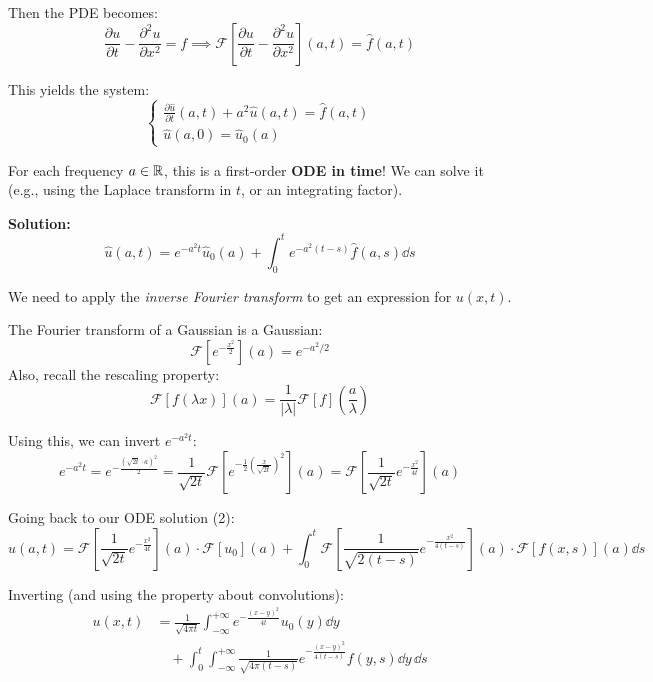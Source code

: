 Then the PDE becomes:
$$ \frac{\partial u}{\partial t} - \frac{\partial^2 u}{\partial x^2} = f \implies \mathcal{F}\left[ \frac{\partial u}{\partial t} - \frac{\partial^2 u}{\partial x^2} \right](a,t) = \hat{f}(a,t) $$

This yields the system:
\begin{equation*}
\begin{cases}
    \displaystyle \frac{\partial \hat{u}}{\partial t}(a,t) + a^2 \hat{u}(a,t) = \hat{f}(a,t) \\[2ex]
    \hat{u}(a,0) = \hat{u}_0(a)
\end{cases}
\end{equation*}

For each frequency $a \in \mathbb{R}$, this is a first-order \textbf{ODE in time}! We can solve it (e.g., using the Laplace transform in $t$, or an integrating factor).

\textbf{Solution:}
\begin{equation}
    \hat{u}(a,t) = e^{-a^2t}\hat{u}_0(a) + \int_0^t e^{-a^2(t-s)}\hat{f}(a,s) \dd s
\end{equation}

We need to apply the \textit{inverse Fourier transform} to get an expression for $u(x,t)$. 

\begin{recall}
    The Fourier transform of a Gaussian is a Gaussian:
    $$ \mathcal{F}\left[ e^{-\frac{x^2}{2}} \right](a) = e^{-a^2/2} $$
    Also, recall the rescaling property: 
    $$ \mathcal{F}[f(\lambda x)](a) = \frac{1}{|\lambda|}\mathcal{F}[f]\left(\frac{a}{\lambda}\right) $$
\end{recall}

Using this, we can invert $e^{-a^2t}$:
$$ e^{-a^2t} = e^{-\frac{(\sqrt{2t} \cdot a)^2}{2}} = \frac{1}{\sqrt{2t}} \mathcal{F}\left[ e^{-\frac{1}{2} \left( \frac{x}{\sqrt{2t}} \right)^2} \right](a) = \mathcal{F}\left[ \frac{1}{\sqrt{2t}} e^{-\frac{x^2}{4t}} \right](a) $$

Going back to our ODE solution (2):
$$ \hat{u}(a,t) = \mathcal{F}\left[ \frac{1}{\sqrt{2t}} e^{-\frac{x^2}{4t}} \right](a) \cdot \mathcal{F}[u_0](a) + \int_0^t \mathcal{F}\left[ \frac{1}{\sqrt{2(t-s)}} e^{-\frac{x^2}{4(t-s)}} \right](a) \cdot \mathcal{F}[f(x,s)](a) \dd s $$

Inverting (and using the property about convolutions):
\begin{equation}
\begin{aligned}
    u(x,t) &= \frac{1}{\sqrt{4\pi t}} \int_{-\infty}^{+\infty} e^{-\frac{(x-y)^2}{4t}} u_0(y) \dd y \\
    &\quad + \int_0^t \int_{-\infty}^{+\infty} \frac{1}{\sqrt{4\pi (t-s)}} e^{-\frac{(x-y)^2}{4(t-s)}} f(y,s) \dd y \, \dd s
\end{aligned}
\end{equation}

